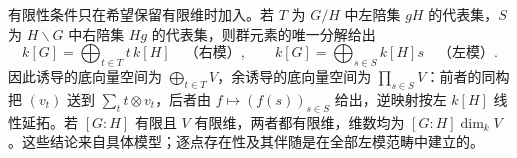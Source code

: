 有限性条件只在希望保留有限维时加入。若 \(T\) 为 \(G/H\) 中左陪集 \(gH\) 的代表集，\(S\) 为 \(H\backslash G\) 中右陪集 \(Hg\) 的代表集，则群元素的唯一分解给出
\[
	k[G]=\bigoplus_{t\in T}t\,k[H]
	\quad\text{（右模）},\qquad
	k[G]=\bigoplus_{s\in S}k[H]s
	\quad\text{（左模）}.
\]
因此诱导的底向量空间为 \(\bigoplus_{t\in T}V\)，余诱导的底向量空间为 \(\prod_{s\in S}V\)：前者的同构把 \((v_t)\) 送到 \(\sum_t t\otimes v_t\)，后者由 \(f\mapsto(f(s))_{s\in S}\) 给出，逆映射按左 \(k[H]\) 线性延拓。若 \([G:H]\) 有限且 \(V\) 有限维，两者都有限维，维数均为 \([G:H]\dim_kV\)。这些结论来自具体模型；逐点存在性及其伴随是在全部左模范畴中建立的。

